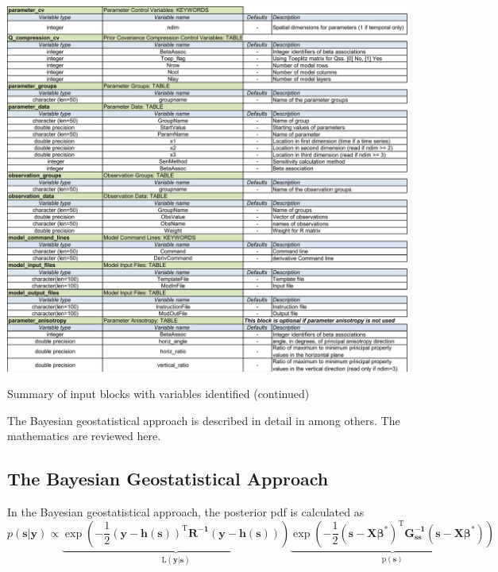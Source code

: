\documentclass[11pt,oneside,onecolumn]{usgsreport}
\begin{document}
\begin{appendix}
\begin{table}[!t]
\begin{center}\includegraphics[scale=0.5]{Variables_for_documentation2}\end{center}

\caption{\label{tab:variables1-2}Summary of input blocks with variables identified (continued)}
\end{table}




The Bayesian geostatistical approach is described in detail in \citet{KitanidisVomvoris1983,HoeksemaKitanidis1984a,Kitanidis1995,NowakCirpka2004}
among others. The mathematics are reviewed here.


\subsection{The Bayesian Geostatistical Approach}

In the Bayesian geostatistical approach, the posterior pdf is calculated
as 
\begin{equation}
p(\mathbf{s|y})\propto\mathrm{\underbrace{\exp\left(\mathbf{-}\frac{1}{2}\left(\mathbf{y-h}(\mathbf{s})\right)^{T}\mathbf{R^{-1}\left(\mathbf{y-h}(\mathbf{s})\right)}\right)}_{L\left(\mathbf{y}|\mathbf{s}\right)}\underbrace{\exp\left(\mathbf{-}\frac{1}{2}(\mathbf{s-X\beta}^{*})^{T}\mathbf{G_{\mathbf{ss}}^{-1}}(\mathbf{s-X\beta^{*}})\right)}_{p\left(\mathbf{s}\right)}}\label{eq:BGA}
\end{equation}


\end{appendix}
\end{document}
